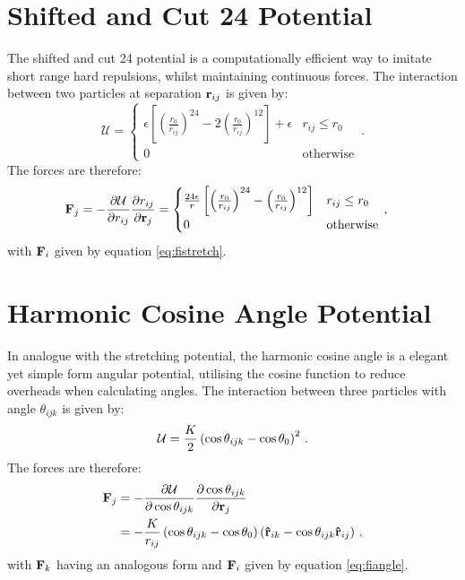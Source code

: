 \section{Shifted and Cut 24 Potential}

The shifted and cut 24 potential is a computationally efficient way to imitate short range hard repulsions, whilst maintaining continuous forces.
The interaction between two particles at separation $\mathbf{r}_{ij}$ is given by:
\begin{equation}
	\mathcal{U} = 
	\begin{cases}
	\epsilon \left[ \left(\frac{r_{0}}{r_{ij}}\right)^{24}-2\left(\frac{r_{0}}{r_{ij}}\right)^{12} \right] + \epsilon & r_{ij}\leq r_{0} \\
	0 & \text{otherwise}
	\end{cases}\,.
\end{equation}
The forces are therefore:
\begin{align}
	\mathbf{F}_j&=-\frac{\partial \mathcal{U}}{\partial r_{ij}} \frac{\partial r_{ij}}{\partial \mathbf{r}_j} = \begin{cases}
	\frac{24\epsilon}{r} \left[ \left(\frac{r_{0}}{r_{ij}}\right)^{24}-\left(\frac{r_{0}}{r_{ij}}\right)^{12} \right] & r_{ij}\leq r_{0} \\
	0 & \text{otherwise}
	\end{cases}    \,,
\end{align}
with $\mathbf{F}_i$ given by equation \eqref{eq:fistretch}.

\section{Harmonic Cosine Angle Potential}

In analogue with the stretching potential, the harmonic cosine angle is a elegant yet simple form angular potential, utilising the cosine function to reduce overheads when calculating angles.
The interaction between three particles with angle $\theta_{ijk}$ is given by:
\begin{equation}
	\mathcal{U} = \frac{K}{2}\left(\cos\theta_{ijk}-\cos\theta_0\right)^2\,.
\end{equation}
The forces are therefore:
\begin{align}
	\mathbf{F}_j&=-\frac{\partial \mathcal{U}}{\partial \cos\theta_{ijk}} \frac{\partial \cos\theta_{ijk}}{\partial \mathbf{r}_j} \nonumber \\ 
	&=-\frac{K}{r_{ij}}\left(\cos\theta_{ijk}-\cos\theta_0\right)\left(\boldsymbol{\hat{\mathbf{r}}}_{ik}-\cos\theta_{ijk}\boldsymbol{\hat{\mathbf{r}}}_{ij}\right) \,,
\end{align}
with $\mathbf{F}_k$ having an analogous form and $\mathbf{F}_i$ given by equation \eqref{eq:fiangle}.

